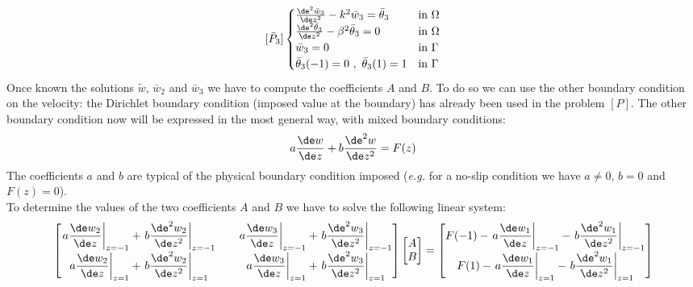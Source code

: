 \[
[\bar P_3]
\begin{cases}
\frac{\de^2 \bar w_3}{\de z^2}-k^2\bar w_3=\bar\theta_3 &\textnormal{in }\Omega\\
\frac{\de^2\bar\theta_3}{\de z^2}-\beta^2 \bar\theta_3=0 &\textnormal{in }\Omega\\
\bar w_3=0 &\textnormal{in }\Gamma\\
\bar\theta_3(-1)=0 \ ,\  \bar\theta_3(1)=1 & \textnormal{in }\Gamma\\
\end{cases}
\]
Once known the solutions $\widetilde{w}$, $\bar w_2$ and $\bar w_3$ we have to compute the coefficients $A$ and $B$. To do so we can use the other boundary condition on the velocity: the Dirichlet boundary condition (imposed value at the boundary) has already been used in the problem $[P]$. The other boundary condition now will be expressed in the most general way, with mixed boundary conditions:
\[
a\frac{\de w}{\de z}+b\frac{\de^2 w}{\de z^2}=F(z)
\]
The coefficients $a$ and $b$ are typical of the physical boundary condition imposed (\textit{e.g.} for a no-slip condition we have $a\neq0$, $b=0$ and $F(z)=0$).\\
To determine the values of the two coefficients $A$ and $B$ we have to solve the following linear system:
\renewcommand\arraystretch{3}
\[
\begin{bmatrix}
\left.a\dfrac{\de w_2}{\de z}\right|_{z=-1}+\left.b\dfrac{\de^2 w_2}{\de z^2}\right|_{z=-1} && \left.a\dfrac{\de w_3}{\de z}\right|_{z=-1}+\left.b\dfrac{\de^2 w_3}{\de z^2}\right|_{z=-1}\\
\left.a\dfrac{\de w_2}{\de z}\right|_{z=1}+\left.b\dfrac{\de^2 w_2}{\de z^2}\right|_{z=1} & &\left.a\dfrac{\de w_3}{\de z}\right|_{z=1}+\left.b\dfrac{\de^2 w_3}{\de z^2}\right|_{z=1}\\
\end{bmatrix}
\begin{bmatrix}
A\\
B\\
\end{bmatrix}
=
\begin{bmatrix}
F(-1)-\left.a\dfrac{\de w_1}{\de z}\right|_{z=-1}-\left.b\dfrac{\de^2 w_1}{\de z^2}\right|_{z=-1} \\
F(1)-\left.a\dfrac{\de w_1}{\de z}\right|_{z=1}-\left.b\dfrac{\de^2 w_1}{\de z^2}\right|_{z=1} 
\end{bmatrix}
\]
\renewcommand\arraystretch{1}



